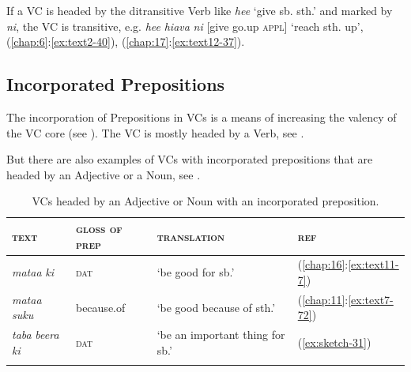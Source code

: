 \documentclass[output=paper]{langscibook}
\begin{document}
If a VC is headed by the ditransitive Verb like \textit{hee} `give sb. sth.' and marked by \textit{ni}, the VC is transitive, e.g. \textit{hee} \textit{hiava} \textit{ni} [give go.up \textsc{appl}] `reach sth. up', (\ref{chap:6}:\ref{ex:text2-40}), (\ref{chap:17}:\ref{ex:text12-37}).
\subsection{Incorporated Prepositions}\label{sec:incorporated}
The incorporation of Prepositions in VCs is a means of increasing the valency of the VC core (see \cite{Mosel:2000pm}). The VC is mostly headed by a Verb, see .

\begin{table}
    \caption{VCs headed by a Verb with incorporated prepositions.} \label{tab:vcverbincorp}
\end{table}

But there are also examples of VCs with incorporated prepositions that are headed by an Adjective or a Noun, see .

\begin{table}
    \caption{VCs headed by an Adjective or Noun with an incorporated preposition.} \label{tab:vcadjnincorp}
\begin{tabularx}{\textwidth}{lXll}
    \lsptoprule
    \textsc{text}&\textsc{gloss of prep}&\textsc{translation}&\textsc{ref}\\
    \midrule
        \textit{mataa} \textit{ki}&\textsc{dat}&`be good for sb.'&(\ref{chap:16}:\ref{ex:text11-7})\\
        \textit{mataa} \textit{suku}&because.of&`be good because of sth.'&(\ref{chap:11}:\ref{ex:text7-72})\\
        \textit{taba} \textit{beera} \textit{ki}&\textsc{dat}&`be an important thing for sb.'&(\ref{ex:sketch-31})\\
    \lspbottomrule
\end{tabularx}
\end{table}
\end{document}
